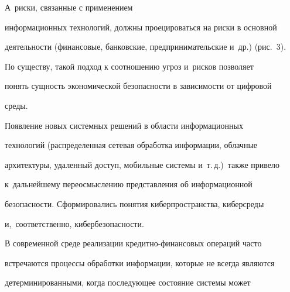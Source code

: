 
 А~риски, связанные с применением 

информационных технологий, должны проецироваться на риски в основной 

деятельности (финансовые, банковские, предпринимательские и~др.) (рис.~3).

   



  

  По существу, такой подход к соотношению угроз и~рисков позволяет 

понять сущность экономической безопасности в зависимости от цифровой 

среды.

  

  Появление новых системных решений в области информационных 

технологий (распределенная сетевая обработка информации, облачные 

архитектуры, удаленный доступ, мобильные системы и~т.\,д.)\ также привело 

к~дальнейшему пе\-ре\-осмыс\-ле\-нию представления об информационной 

безопасности. Сформировались понятия киберпространства, киберсреды 

и,~соответственно, ки\-бер\-без\-опас\-ности.

  

  В современной среде реализации кредитно-финансовых операций часто 

встречаются процессы обработки информации, которые не всегда являются 

детерминированными, когда последующее состояние системы может 

